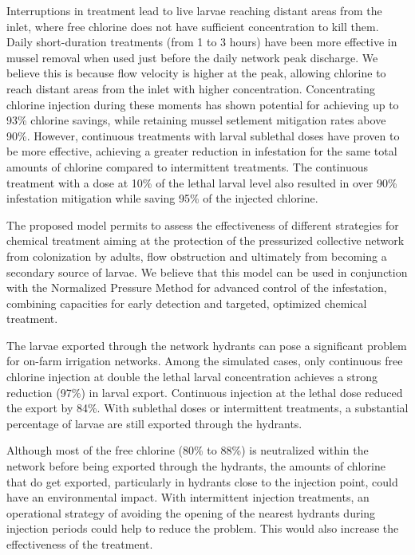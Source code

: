 \documentclass[review,authoryear]{elsarticle}
\begin{document}
Interruptions in treatment lead to live larvae reaching distant areas from the
inlet, where free chlorine does not have sufficient concentration to kill them.
Daily short-duration treatments (from 1 to 3 hours) have been more effective in
mussel removal when used just before the daily network peak discharge. We
believe this is because flow velocity is higher at the peak, allowing chlorine
to reach distant areas from the inlet with higher concentration. Concentrating
chlorine injection during these moments has shown potential for achieving up to
93\% chlorine savings, while retaining mussel setlement mitigation rates above
90\%. However, continuous treatments with larval sublethal doses have proven to
be more effective, achieving a greater reduction in infestation for the same
total amounts of chlorine compared to intermittent treatments. The continuous
treatment with a dose at 10\% of the lethal larval level also resulted in over
90\% infestation mitigation while saving 95\% of the injected chlorine.

The proposed model permits to assess the effectiveness of different strategies
for chemical treatment aiming at the protection of the pressurized collective
network from colonization by adults, flow obstruction and ultimately from
becoming a secondary source of larvae. We believe that this model can be used in
conjunction with the Normalized Pressure Method \citep{MoralesHernandez18,
MoralesHernandez22} for advanced control of the infestation, combining
capacities for early detection and targeted, optimized chemical treatment.

The larvae exported through the network hydrants can pose a significant
problem for on-farm irrigation networks. Among the simulated cases, only
continuous free chlorine injection at double the lethal larval concentration
achieves a strong reduction (97\%) in larval export. Continuous injection at the
lethal dose reduced the export by 84\%. With sublethal doses or intermittent
treatments, a substantial percentage of larvae are still exported through the
hydrants.

Although most of the free chlorine (80\% to 88\%) is neutralized within the
network before being exported through the hydrants, the amounts of chlorine that
do get exported, particularly in hydrants close to the injection point, could
have an environmental impact. With intermittent injection treatments, an
operational strategy of avoiding the opening of the nearest hydrants during
injection periods could help to reduce the problem. This would also increase the
effectiveness of the treatment.
\end{document}
